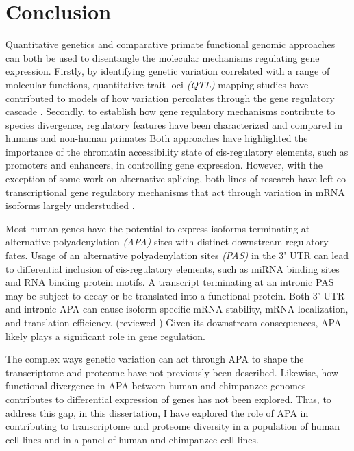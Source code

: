 \chapter{Conclusion}\label{conclusion}


Quantitative genetics and comparative primate functional genomic approaches can both be used to disentangle the molecular mechanisms regulating gene expression. Firstly, by identifying genetic variation correlated with a range of molecular functions, quantitative trait loci \emph{(QTL)} mapping studies have contributed to models of how variation percolates through the gene regulatory cascade \citep{degner_dnase_2012, mcvicker_identification_2013, li_rna_2016, pickrell_understanding_2010}. Secondly, to establish how gene regulatory mechanisms contribute to species divergence, regulatory features have been characterized and compared in humans and non-human primates \citep{pai_comparative_2014, romero_widespread_2018, eres_reorganization_2019, blake_comparison_2020, khan_primate_2013, pai_genome-wide_2011, shibata_extensive_2012-1} Both approaches have highlighted the importance of the chromatin accessibility state of cis-regulatory elements, such as promoters and enhancers, in controlling gene expression. However, with the exception of some work on alternative splicing, both lines of research have left co-transcriptional gene regulatory mechanisms that act through variation in mRNA isoforms largely understudied \citep{blekhman_sex-specific_2010, li_rna_2016}. 


Most human genes have the potential to express isoforms terminating at alternative polyadenylation \emph{(APA)} sites with distinct downstream regulatory fates. Usage of an alternative polyadenylation sites \emph{(PAS)} in the 3' UTR can lead to differential inclusion of cis-regulatory elements, such as miRNA binding sites and RNA binding protein motifs. A transcript terminating at an intronic PAS may be subject to decay or be translated into a functional protein. Both 3' UTR and intronic APA can cause isoform-specific mRNA stability, mRNA localization, and translation efficiency. (reviewed \citep{tian_alternative_2017}) Given its downstream consequences, APA likely plays a significant role in gene regulation.

 The complex ways genetic variation can act through APA to shape the transcriptome and proteome have not previously been described. Likewise, how functional divergence in APA between human and chimpanzee genomes contributes to differential expression of genes has not been explored. Thus, to address this gap, in this dissertation, I have explored the role of APA in contributing to transcriptome and proteome diversity in a population of human cell lines and in a panel of human and chimpanzee cell lines.
 
